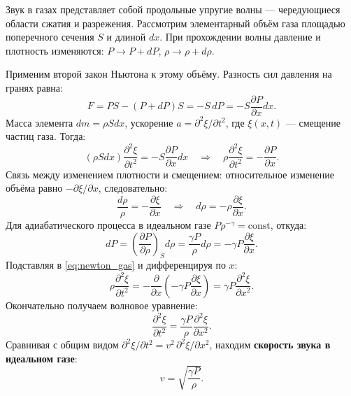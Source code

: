 \begin{theorem}
Звук в газах представляет собой продольные упругие волны --- чередующиеся области сжатия и разрежения. Рассмотрим элементарный объём газа площадью поперечного сечения $S$ и длиной $dx$. При прохождении волны давление и плотность изменяются: $P \to P + dP$, $\rho \to \rho + d\rho$.

Применим второй закон Ньютона к этому объёму. Разность сил давления на гранях равна:
\begin{equation}
    F = P S - (P + dP) S = -S \, dP = -S \frac{\partial P}{\partial x} dx.
\end{equation}
Масса элемента $dm = \rho S dx$, ускорение $a = \partial^2 \xi / \partial t^2$, где $\xi(x,t)$ --- смещение частиц газа. Тогда:
\begin{equation}
    (\rho S dx) \frac{\partial^2 \xi}{\partial t^2} = -S \frac{\partial P}{\partial x} dx \quad \Rightarrow \quad \rho \frac{\partial^2 \xi}{\partial t^2} = -\frac{\partial P}{\partial x}. \label{eq:newton_gas}
\end{equation}
Связь между изменением плотности и смещением: относительное изменение объёма равно $-\partial \xi / \partial x$, следовательно:
\begin{equation}
    \frac{d\rho}{\rho} = -\frac{\partial \xi}{\partial x} \quad \Rightarrow \quad d\rho = -\rho \frac{\partial \xi}{\partial x}.
\end{equation}
Для адиабатического процесса в идеальном газе $P \rho^{-\gamma} = \text{const}$, откуда:
\begin{equation}
    dP = \left(\frac{\partial P}{\partial \rho}\right)_S d\rho = \frac{\gamma P}{\rho} d\rho = -\gamma P \frac{\partial \xi}{\partial x}.
\end{equation}
Подставляя в \eqref{eq:newton_gas} и дифференцируя по $x$:
\begin{equation}
    \rho \frac{\partial^2 \xi}{\partial t^2} = -\frac{\partial}{\partial x}\left(-\gamma P \frac{\partial \xi}{\partial x}\right) = \gamma P \frac{\partial^2 \xi}{\partial x^2}.
\end{equation}
Окончательно получаем волновое уравнение:
\begin{equation}
    \frac{\partial^2 \xi}{\partial t^2} = \frac{\gamma P}{\rho} \frac{\partial^2 \xi}{\partial x^2}.
\end{equation}
Сравнивая с общим видом $\partial^2 \xi / \partial t^2 = v^2 \, \partial^2 \xi / \partial x^2$, находим \textbf{скорость звука в идеальном газе}:
\begin{equation}
    v = \sqrt{\frac{\gamma P}{\rho}}. \label{eq:sound_speed_gas}
\end{equation}
\end{theorem}

